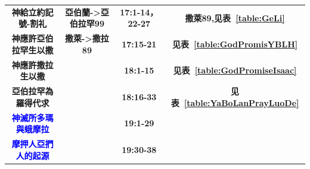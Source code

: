 \begin{table}[!hbp]
\begin{threeparttable}
\begin{tabular}{c c c c}
\multicolumn{1}{L{\dimexpr0.25\linewidth-1\tabcolsep\relax}}{\bfseries 神給立約記號-割礼} 
& \multicolumn{1}{L{\dimexpr0.3\linewidth-1\tabcolsep\relax}}{\bfseries 亞伯蘭->亞伯拉罕99}  
& \multicolumn{1}{L{\dimexpr0.2\linewidth-1\tabcolsep\relax}}{\bfseries 17:1-14，22-27}
& \multicolumn{1}{L{\dimexpr0.2\linewidth-1\tabcolsep\relax}}{\bfseries 撒萊89,见表~\ref{table:GeLi}}\\

\multicolumn{1}{L{\dimexpr0.25\linewidth-1\tabcolsep\relax}}{\bfseries 神應許亞伯拉罕生以撒} 
& \multicolumn{1}{L{\dimexpr0.2\linewidth-1\tabcolsep\relax}}{\bfseries 撒萊->撒拉89}  
& \multicolumn{1}{L{\dimexpr0.1\linewidth-1\tabcolsep\relax}}{\bfseries 17:15-21}
& \multicolumn{1}{L{\dimexpr0.2\linewidth-1\tabcolsep\relax}}{\bfseries 见表~\ref{table:GodPromisYBLH}}\\

\multicolumn{1}{L{\dimexpr0.25\linewidth-1\tabcolsep\relax}}{\bfseries 神應許撒拉生以撒} 
& \multicolumn{1}{L{\dimexpr0.2\linewidth-1\tabcolsep\relax}}{\bfseries }  
& \multicolumn{1}{L{\dimexpr0.1\linewidth-1\tabcolsep\relax}}{\bfseries 18:1-15}
& \multicolumn{1}{L{\dimexpr0.2\linewidth-1\tabcolsep\relax}}{\bfseries 见表~\ref{table:GodPromiseIsaac}}\\

\multicolumn{1}{L{\dimexpr0.25\linewidth-1\tabcolsep\relax}}{\bfseries 亞伯拉罕為羅得代求}  
& \multicolumn{1}{L{\dimexpr0.2\linewidth-1\tabcolsep\relax}}{\bfseries } 
& \multicolumn{1}{L{\dimexpr0.1\linewidth-1\tabcolsep\relax}}{\bfseries 18:16-33}
& \multicolumn{1}{L{\dimexpr0.2\linewidth-1\tabcolsep\relax}}{\bfseries 见表~\ref{table:YaBoLanPrayLuoDe}}\\

\multicolumn{1}{L{\dimexpr0.25\linewidth-1\tabcolsep\relax}}{\bfseries \textcolor{blue}{神滅所多瑪與蛾摩拉}} 
& \multicolumn{1}{L{\dimexpr0.2\linewidth-1\tabcolsep\relax}}{\bfseries }  
& \multicolumn{1}{L{\dimexpr0.1\linewidth-1\tabcolsep\relax}}{\bfseries 19:1-29}
& \multicolumn{1}{L{\dimexpr0.2\linewidth-1\tabcolsep\relax}}{\bfseries }\\

\multicolumn{1}{L{\dimexpr0.25\linewidth-1\tabcolsep\relax}}{\bfseries \textcolor{blue}{摩押人亞捫人的起源}}  
& \multicolumn{1}{L{\dimexpr0.2\linewidth-1\tabcolsep\relax}}{\bfseries } 
& \multicolumn{1}{L{\dimexpr0.1\linewidth-1\tabcolsep\relax}}{\bfseries 19:30-38}
& \multicolumn{1}{L{\dimexpr0.2\linewidth-1\tabcolsep\relax}}{\bfseries }\\


\end{tabular}
\end{threeparttable}
\end{table}
